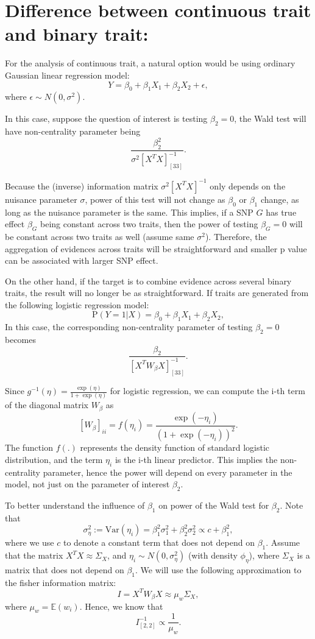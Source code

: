 \documentclass[
]{article}
\begin{document}
\hypertarget{difference-between-continuous-trait-and-binary-trait}{%
\section{Difference between continuous trait and binary
trait:}\label{difference-between-continuous-trait-and-binary-trait}}

For the analysis of continuous trait, a natural option would be using
ordinary Gaussian linear regression model:
\[Y = \beta_0 + \beta_1 X_1 + \beta_2X_2+\epsilon,\] where
\(\epsilon \sim N(0,\sigma^2)\).

In this case, suppose the question of interest is testing \(\beta_2=0\),
the Wald test will have non-centrality parameter being
\[\frac{\beta_2^2}{\sigma^2[X^TX]^{-1}_{[33]}}.\]

Because the (inverse) information matrix \(\sigma^2[X^TX]^{-1}\) only
depends on the nuisance parameter \(\sigma\), power of this test will
not change as \(\beta_0\) or \(\beta_1\) change, as long as the nuisance
parameter is the same. This implies, if a SNP \(G\) has true effect
\(\beta_G\) being constant across two traits, then the power of testing
\(\beta_G = 0\) will be constant across two traits as well (assume same
\(\sigma^2\)). Therefore, the aggregation of evidences across traits
will be straightforward and smaller p value can be associated with
larger SNP effect.

On the other hand, if the target is to combine evidence across several
binary traits, the result will no longer be as straightforward. If
traits are generated from the following logistic regression model:
\[\text{P}(Y=1|X) = \beta_0 + \beta_1 X_1 + \beta_2X_2,\] In this case,
the corresponding non-centrality parameter of testing \(\beta_2=0\)
becomes \[\frac{\beta_2}{[X^TW_\beta X]^{-1}_{[33]}}.\]

Since \(g^{-1}(\eta)= \frac{\exp(\eta)}{1+\exp(\eta)}\) for logistic
regression, we can compute the i-th term of the diagonal matrix
\(W_\beta\) as
\[[W_\beta]_{ii} = f(\eta_i)=\frac{\exp(-\eta_i)}{(1+\exp(-\eta_i))^2}.\]
The function \(f(.)\) represents the density function of standard
logistic distribution, and the term \(\eta_i\) is the i-th linear
predictor. This implies the non-centrality parameter, hence the power
will depend on every parameter in the model, not just on the parameter
of interest \(\beta_2\).

To better understand the influence of \(\beta_1\) on power of the Wald
test for \(\beta_2\). Note that
\[\sigma_\eta^2:=\text{Var}(\eta_i) = \beta_1^2\sigma_1^2+\beta_2^2\sigma_2^2 \propto c +\beta_1^2,\]
where we use \(c\) to denote a constant term that does not depend on
\(\beta_1\). Assume that the matrix \(X^TX \approx \Sigma_X\), and
\(\eta_i\sim N(0,\sigma_\eta^2)\) (with density \(\phi_\eta\)), where
\(\Sigma_X\) is a matrix that does not depend on \(\beta_1\). We will
use the following approximation to the fisher information
matrix:\[I = X^TW_\beta X \approx \mu_w \Sigma_X,\] where
\(\mu_w = \mathbb{E}(w_i)\). Hence, we know that
\[I^{-1}_{[2,2]} \propto \frac{1}{\mu_w}.\]
\end{document}

